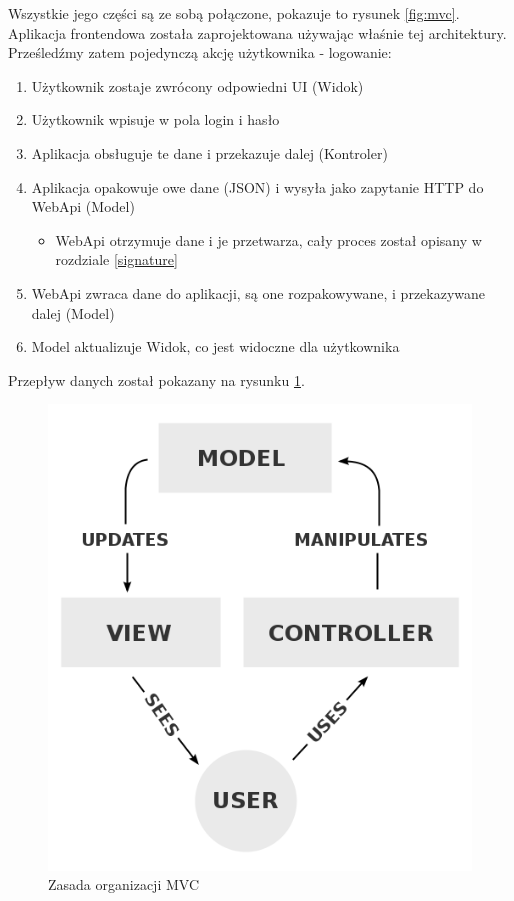 \documentclass[12pt]{article}
\numberwithin{figure}{section}
\begin{document}
\begin{sloppypar}
Wszystkie jego części są ze sobą połączone, pokazuje to rysunek \ref{fig:mvc}.
Aplikacja frontendowa została zaprojektowana używając właśnie tej architektury. 
Prześledźmy zatem pojedynczą akcję użytkownika - logowanie:
\begin{enumerate}
    \item Użytkownik zostaje zwrócony odpowiedni UI (Widok)
    \item Użytkownik wpisuje w pola login i hasło 
    \item Aplikacja obsługuje te dane i przekazuje dalej (Kontroler)
    \item Aplikacja opakowuje owe dane (JSON) i wysyła jako zapytanie HTTP do WebApi (Model)
        \begin{itemize}
            \item WebApi otrzymuje dane i je przetwarza, cały proces został opisany w rozdziale \ref{signature}
        \end{itemize}
    \item WebApi zwraca dane do aplikacji, są one rozpakowywane, i przekazywane dalej (Model)
    \item Model aktualizuje Widok, co jest widoczne dla użytkownika
\end{enumerate}
    
Przepływ danych został pokazany na rysunku \ref{fig:mvc-flow}.
    
\begin{figure}[H] 
    \centering
    \includegraphics[width=.8\textwidth]{images/chapter_3/mvc-flow.png}
    \caption{Zasada organizacji MVC \cite{mvc-flow}}
    \label{fig:mvc-flow}
\end{figure}
    

\end{sloppypar}
\end{document}

